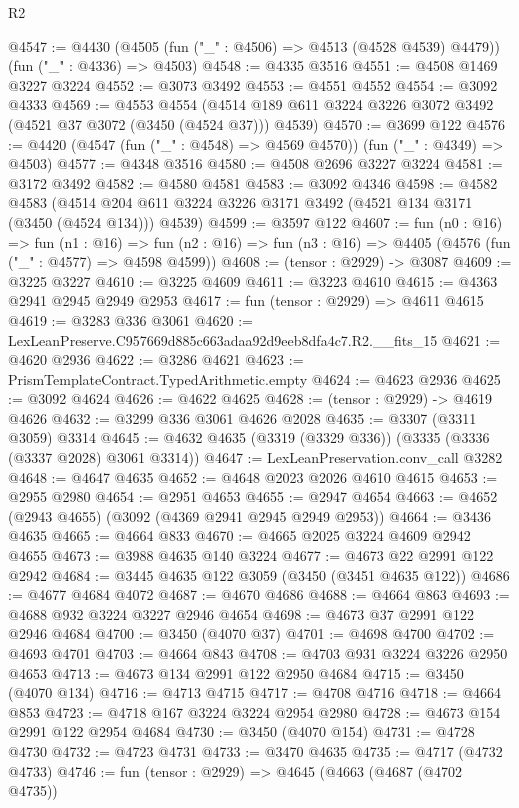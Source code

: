 \begin{lexlean}{R2}
\begin{coremodule}
@4547 := @4430 (@4505 (fun ("_" : @4506) => @4513 (@4528 @4539) @4479)) (fun ("_" : @4336) => @4503)
@4548 := @4335 @3516
@4551 := @4508 @1469 @3227 @3224
@4552 := @3073 @3492
@4553 := @4551 @4552
@4554 := @3092 @4333
@4569 := @4553
    @4554
    (@4514 @189 @611 @3224 @3226 @3072 @3492 (@4521 @37 @3072 (@3450 (@4524 @37))) @4539)
@4570 := @3699 @122
@4576 := @4420 (@4547 (fun ("_" : @4548) => @4569 @4570)) (fun ("_" : @4349) => @4503)
@4577 := @4348 @3516
@4580 := @4508 @2696 @3227 @3224
@4581 := @3172 @3492
@4582 := @4580 @4581
@4583 := @3092 @4346
@4598 := @4582
    @4583
    (@4514 @204 @611 @3224 @3226 @3171 @3492 (@4521 @134 @3171 (@3450 (@4524 @134))) @4539)
@4599 := @3597 @122
@4607 := fun (n0 : @16) =>
  fun (n1 : @16) =>
  fun (n2 : @16) => fun (n3 : @16) => @4405 (@4576 (fun ("_" : @4577) => @4598 @4599))
@4608 := (tensor : @2929) -> @3087
@4609 := @3225 @3227
@4610 := @3225 @4609
@4611 := @3223 @4610
@4615 := @4363 @2941 @2945 @2949 @2953
@4617 := fun (tensor : @2929) => @4611 @4615
@4619 := @3283 @336 @3061
@4620 := LexLeanPreserve.C957669d885c663adaa92d9eeb8dfa4c7.R2.__fits_15
@4621 := @4620 @2936
@4622 := @3286 @4621
@4623 := PrismTemplateContract.TypedArithmetic.empty
@4624 := @4623 @2936
@4625 := @3092 @4624
@4626 := @4622 @4625
@4628 := (tensor : @2929) -> @4619 @4626
@4632 := @3299 @336 @3061 @4626 @2028
@4635 := @3307 (@3311 @3059) @3314
@4645 := @4632 @4635 (@3319 (@3329 @336)) (@3335 (@3336 (@3337 @2028) @3061 @3314))
@4647 := LexLeanPreservation.conv_call @3282
@4648 := @4647 @4635
@4652 := @4648 @2023 @2026 @4610 @4615
@4653 := @2955 @2980
@4654 := @2951 @4653
@4655 := @2947 @4654
@4663 := @4652 (@2943 @4655) (@3092 (@4369 @2941 @2945 @2949 @2953))
@4664 := @3436 @4635
@4665 := @4664 @833
@4670 := @4665 @2025 @3224 @4609 @2942 @4655
@4673 := @3988 @4635 @140 @3224
@4677 := @4673 @22 @2991 @122 @2942
@4684 := @3445 @4635 @122 @3059 (@3450 (@3451 @4635 @122))
@4686 := @4677 @4684 @4072
@4687 := @4670 @4686
@4688 := @4664 @863
@4693 := @4688 @932 @3224 @3227 @2946 @4654
@4698 := @4673 @37 @2991 @122 @2946 @4684
@4700 := @3450 (@4070 @37)
@4701 := @4698 @4700
@4702 := @4693 @4701
@4703 := @4664 @843
@4708 := @4703 @931 @3224 @3226 @2950 @4653
@4713 := @4673 @134 @2991 @122 @2950 @4684
@4715 := @3450 (@4070 @134)
@4716 := @4713 @4715
@4717 := @4708 @4716
@4718 := @4664 @853
@4723 := @4718 @167 @3224 @3224 @2954 @2980
@4728 := @4673 @154 @2991 @122 @2954 @4684
@4730 := @3450 (@4070 @154)
@4731 := @4728 @4730
@4732 := @4723 @4731
@4733 := @3470 @4635
@4735 := @4717 (@4732 @4733)
@4746 := fun (tensor : @2929) =>
  @4645
    (@4663
      (@4687 (@4702 @4735))

\end{coremodule}
\end{lexlean}
